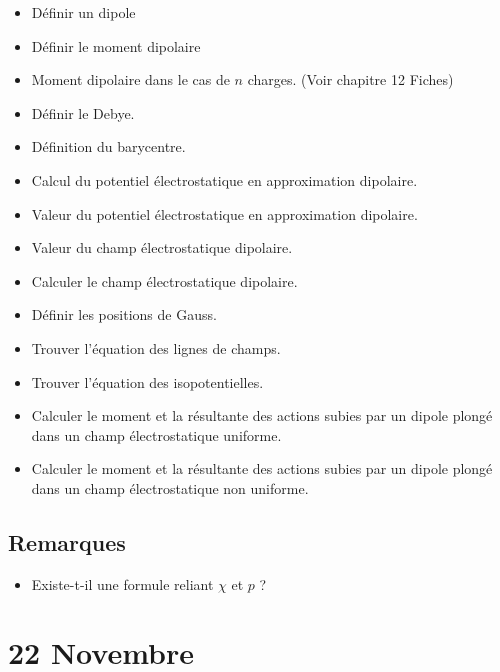 \documentclass[a4paper, 11pt, hidelinks]{article}
\begin{document}
\begin{itemize}
    \item Définir un dipole \cite{Chapitre12}
    \item Définir le moment dipolaire \cite{Chapitre12}
    \item Moment dipolaire dans le cas de $n$ charges. (Voir chapitre 12 Fiches)
    \item Définir le Debye. \cite{Chapitre12}
    \item Définition du barycentre. \cite{Chapitre12}
    \item Calcul du potentiel électrostatique en approximation dipolaire. \cite{Chapitre12}
    \item Valeur du potentiel électrostatique en approximation dipolaire. \cite{Chapitre12}
    \item Valeur du champ électrostatique dipolaire. \cite{Chapitre12}
    \item Calculer le champ électrostatique dipolaire. \cite{Chapitre12}
    \item Définir les positions de Gauss. \cite{Chapitre12}
    \item Trouver l'équation des lignes de champs. \cite{Chapitre12}
    \item Trouver l'équation des isopotentielles. \cite{Chapitre12}
    \item Calculer le moment et la résultante des actions subies par un dipole plongé dans un champ électrostatique uniforme. \cite{Chapitre12}
    \item Calculer le moment et la résultante des actions subies par un dipole plongé dans un champ électrostatique non uniforme. \cite{Chapitre12}
\end{itemize}



\subsection{Remarques}


\begin{itemize}
    \item Existe-t-il une formule reliant $\chi$ et $p$ ?
\end{itemize}



\section{22 Novembre}
\end{document}
